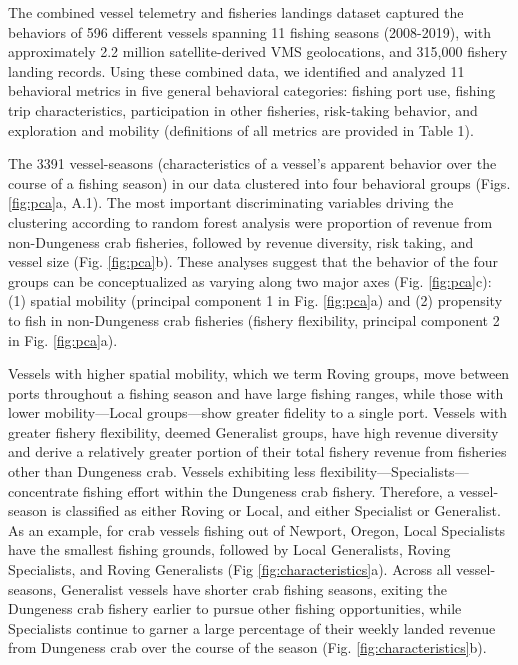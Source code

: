 \documentclass[]{elsarticle} %
\begin{document}
The combined vessel telemetry and fisheries landings dataset captured
the behaviors of 596 different vessels spanning 11 fishing seasons
(2008-2019), with approximately 2.2 million satellite-derived VMS
geolocations, and 315,000 fishery landing records. Using these combined
data, we identified and analyzed 11 behavioral metrics in five general
behavioral categories: fishing port use, fishing trip characteristics,
participation in other fisheries, risk-taking behavior, and exploration
and mobility (definitions of all metrics are provided in Table 1).

The 3391 vessel-seasons (characteristics of a vessel's apparent behavior
over the course of a fishing season) in our data clustered into four
behavioral groups (Figs. \ref{fig:pca}a, A.1). The most important
discriminating variables driving the clustering according to random
forest analysis were proportion of revenue from non-Dungeness crab
fisheries, followed by revenue diversity, risk taking, and vessel size
(Fig. \ref{fig:pca}b). These analyses suggest that the behavior of the
four groups can be conceptualized as varying along two major axes (Fig.
\ref{fig:pca}c): (1) spatial mobility (principal component 1 in Fig.
\ref{fig:pca}a) and (2) propensity to fish in non-Dungeness crab
fisheries (fishery flexibility, principal component 2 in Fig.
\ref{fig:pca}a).

Vessels with higher spatial mobility, which we term Roving groups, move
between ports throughout a fishing season and have large fishing ranges,
while those with lower mobility---Local groups---show greater fidelity
to a single port. Vessels with greater fishery flexibility, deemed
Generalist groups, have high revenue diversity and derive a relatively
greater portion of their total fishery revenue from fisheries other than
Dungeness crab. Vessels exhibiting less
flexibility---Specialists---concentrate fishing effort within the
Dungeness crab fishery. Therefore, a vessel-season is classified as
either Roving or Local, and either Specialist or Generalist. As an
example, for crab vessels fishing out of Newport, Oregon, Local
Specialists have the smallest fishing grounds, followed by Local
Generalists, Roving Specialists, and Roving Generalists (Fig
\ref{fig:characteristics}a). Across all vessel-seasons, Generalist
vessels have shorter crab fishing seasons, exiting the Dungeness crab
fishery earlier to pursue other fishing opportunities, while Specialists
continue to garner a large percentage of their weekly landed revenue
from Dungeness crab over the course of the season (Fig.
\ref{fig:characteristics}b).
\end{document}
